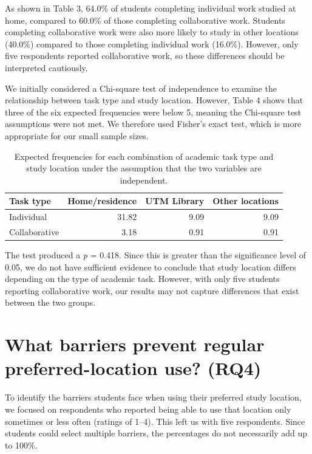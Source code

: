 \documentclass[11pt,letterpaper]{article}
\begin{document}
As shown in Table 3, 64.0\% of students completing individual work studied at home, compared to 60.0\% of those completing collaborative work. Students completing collaborative work were also more likely to study in other locations (40.0\%) compared to those completing individual work (16.0\%). However, only five respondents reported collaborative work, so these differences should be interpreted cautiously.

We initially considered a Chi-square test of independence to examine the relationship between task type and study location. However, Table 4 shows that three of the six expected frequencies were below 5, meaning the Chi-square test assumptions were not met. We therefore used Fisher's exact test, which is more appropriate for our small sample sizes.

\begin{table}[H]\centering\small
\label{tab:expected}
\begin{tabular}{@{}lrrr@{}}\toprule
Task type & Home/residence & UTM Library & Other locations\\\midrule
Individual & 31.82 & 9.09 & 9.09\\
Collaborative & 3.18 & 0.91 & 0.91\\\bottomrule\end{tabular}
\caption{Expected frequencies for each combination of academic task type and study location under the assumption that the two variables are independent.}
\end{table}

The test produced a \textit{p} = 0.418. Since this is greater than the significance level of 0.05, we do not have sufficient evidence to conclude that study location differs depending on the type of academic task. However, with only five students reporting collaborative work, our results may not capture differences that exist between the two groups.


\section{What barriers prevent regular preferred-location use? (RQ4)}
To identify the barriers students face when using their preferred study location, we focused on respondents who reported being able to use that location only sometimes or less often (ratings of 1–4). This left us with five respondents. Since students could select multiple barriers, the percentages do not necessarily add up to 100\%.
\end{document}
